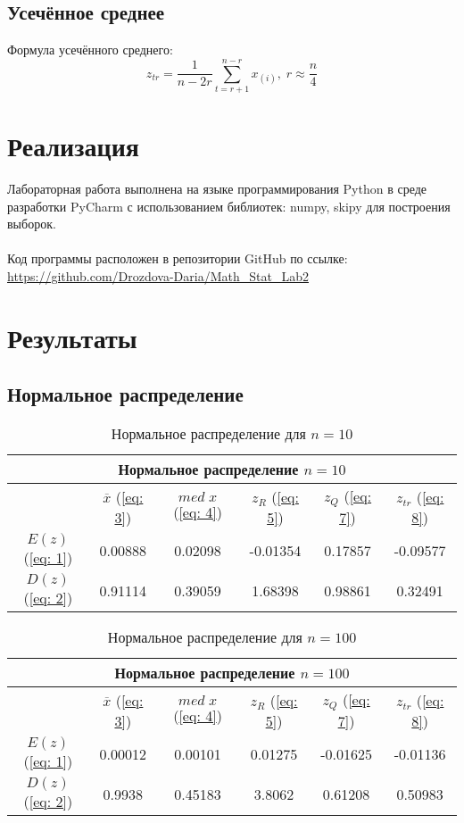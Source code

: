 \documentclass{article}
\begin{document}
\subsection{Усечённое среднее}
  Формула усечённого среднего:
  \begin{equation}
  z_{tr} = \frac{1}{n-2r}\sum_{t=r+1}^{n-r}x_{(i)}, \; r\approx\frac{n}{4}
  \label{eq: 8}
  \end{equation}

\newpage
\section{Реализация}
Лабораторная работа выполнена на языке программирования Python в среде разработки PyCharm с использованием библиотек: numpy, skipy для построения выборок.
\\
\\
Код программы расположен в репозитории GitHub по ссылке: \url{https://github.com/Drozdova-Daria/Math_Stat_Lab2}

\newpage
\section{Результаты}
\subsection{Нормальное распределение}
\begin{table}[hb]
\begin{center}
\begin{tabular}{|c|c|c|c|c|c|}
\hline 
\multicolumn{6}{|c|}{Нормальное распределение $n=10$} \\ 
\hline 
  & $\overline{x}$ (\ref{eq: 3}) & $med \; x$ (\ref{eq: 4}) & $z_R$ (\ref{eq: 5}) & $z_Q$ (\ref{eq: 7}) & $z_{tr}$ (\ref{eq: 8}) \\ 
\hline 
$E(z)$ (\ref{eq: 1}) & 0.00888 & 0.02098 & -0.01354 & 0.17857 & -0.09577 \\ 
\hline 
$D(z)$ (\ref{eq: 2}) & 0.91114 & 0.39059 & 1.68398 & 0.98861 & 0.32491 \\ 
\hline 
\end{tabular} 
\caption{Нормальное распределение для $n=10$}
\end{center}
\end{table}

\begin{table}[hb]
\begin{center}
\begin{tabular}{|c|c|c|c|c|c|}
\hline 
\multicolumn{6}{|c|}{Нормальное распределение $n=100$} \\ 
\hline 
  & $\overline{x}$ (\ref{eq: 3}) & $med \; x$ (\ref{eq: 4}) & $z_R$ (\ref{eq: 5}) & $z_Q$ (\ref{eq: 7}) & $z_{tr}$ (\ref{eq: 8}) \\ 
\hline 
$E(z)$ (\ref{eq: 1}) & 0.00012 & 0.00101 & 0.01275 & -0.01625 & -0.01136 \\ 
\hline 
$D(z)$ (\ref{eq: 2}) & 0.9938 & 0.45183 & 3.8062 & 0.61208 & 0.50983 \\ 
\hline 
\end{tabular} 
\caption{Нормальное распределение для $n=100$}
\end{center}
\end{table}
\end{document}
